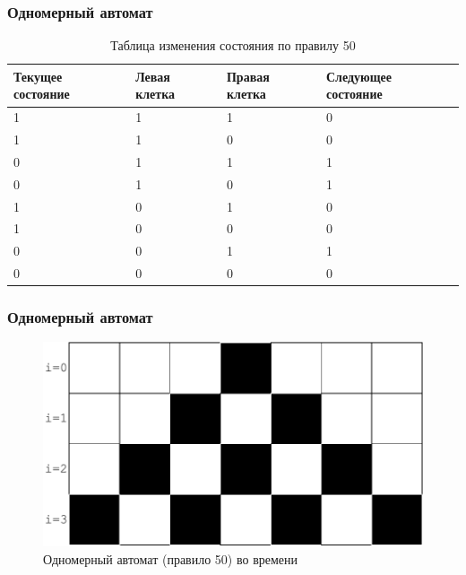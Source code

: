 \documentclass{beamer}
\begin{document}
    \begin{frame}
        \frametitle{Одномерный автомат}
        \begin{table}
            \begin{center}
                \begin{tabular}{|p{2cm}|p{2cm}|p{2cm}|p{2cm}|}
                    \hline
                    Текущее состояние & Левая клетка & Правая клетка & Следующее состояние\\
                    \hline
                    1  &  1  &  1  &  0\\
                    \hline
                    1  &  1  &  0  &  0\\
                    \hline
                    0  &  1  &  1  &  1\\
                    \hline
                    0  &  1  &  0  &  1\\
                    \hline
                    1  &  0  &  1  &  0\\
                    \hline
                    1  &  0  &  0  &  0\\
                    \hline
                    0  &  0  &  1  &  1\\
                    \hline
                    0  &  0  &  0  &  0\\
                    \hline
                \end{tabular}
            \end{center}
            \caption{Таблица изменения состояния по правилу 50}
            \label{tab:rule50logic}
        \end{table}
    \end{frame}

    \begin{frame}
        \frametitle{Одномерный автомат}
        \begin{figure}
            \begin{center}
                \includegraphics[width=\linewidth]{pict/oneD50}
            \end{center}
            \caption{Одномерный автомат (правило 50) во времени}
            \label{fig:oneD50}
        \end{figure}
    \end{frame}
\end{document}
